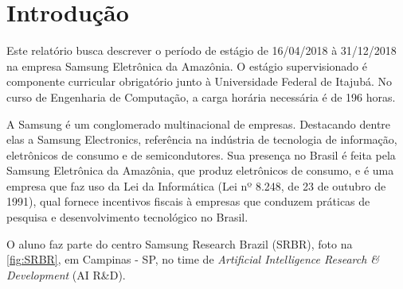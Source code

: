 \documentclass[
	12pt,				%
    oneside,			%
	a4paper,			%
	english,			%
	french,				%
	spanish,			%
	brazil				%
	]{abntex2}
\begin{document}

\frenchspacing

\imprimircapa
\imprimirfolhaderosto*

\tableofcontents*
\clearpage

\textual

\chapter{Introdução}

Este relatório busca descrever o período de estágio de 16/04/2018 à 31/12/2018 na empresa Samsung Eletrônica da Amazônia. O estágio supervisionado é componente curricular obrigatório junto à Universidade Federal de Itajubá. No curso de Engenharia de Computação, a carga horária necessária é de 196 horas.

A Samsung é um conglomerado multinacional de empresas. Destacando dentre elas a Samsung Electronics, referência na indústria de tecnologia de informação, eletrônicos de consumo e de semicondutores. Sua presença no Brasil é feita pela Samsung Eletrônica da Amazônia, que produz eletrônicos de consumo, e é uma empresa que faz uso da Lei da Informática (Lei nº 8.248, de 23 de outubro de 1991), qual fornece incentivos fiscais à empresas que conduzem práticas de pesquisa e desenvolvimento tecnológico no Brasil.

O aluno faz parte do centro Samsung Research Brazil (SRBR), foto na \autoref{fig:SRBR}, em Campinas - SP, no time de \textit{Artificial Intelligence Research \& Development} (AI R\&D).
\end{document}
